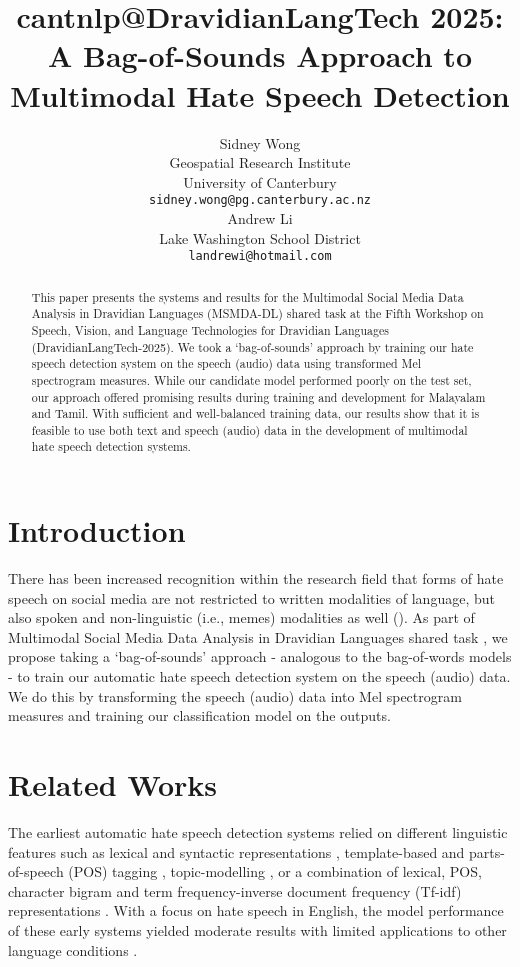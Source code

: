\documentclass[11pt]{article}
\title{cantnlp@DravidianLangTech 2025: A Bag-of-Sounds Approach to Multimodal Hate Speech Detection}
\author{Sidney Wong \\
 Geospatial Research Institute \\
 University of Canterbury \\
 \texttt{sidney.wong@pg.canterbury.ac.nz} \\\And
  Andrew Li \\
  Lake Washington School District \\
  \texttt{landrewi@hotmail.com} \\}
\begin{document}
\maketitle
\begin{abstract}

    This paper presents the systems and results for the Multimodal Social Media Data Analysis in Dravidian Languages (MSMDA-DL) shared task at the Fifth Workshop on Speech, Vision, and Language Technologies for Dravidian Languages (DravidianLangTech-2025). We took a `bag-of-sounds' approach by training our hate speech detection system on the speech (audio) data using transformed Mel spectrogram measures. While our candidate model performed poorly on the test set, our approach offered promising results during training and development for Malayalam and Tamil. With sufficient and well-balanced training data, our results show that it is feasible to use both text and speech (audio) data in the development of multimodal hate speech detection systems.

\end{abstract}

\section{Introduction}
\label{sec:introduction}

    There has been increased recognition within the research field that forms of hate speech on social media are not restricted to written modalities
    of language, but also spoken \cite{chhabra_literature_2023} and non-linguistic (i.e., memes) modalities as well (\citealp{kiela_hateful_2020}). As part of Multimodal Social Media Data Analysis in Dravidian Languages shared task \cite{lal_g_overview_2025}, we propose taking a `bag-of-sounds' approach - analogous to the bag-of-words models - to train our automatic hate speech detection system on the speech (audio) data. We do this by transforming the speech (audio) data into Mel spectrogram measures and training our classification model on the outputs.

\section{Related Works}
\label{sec:related_works}

    The earliest automatic hate speech detection systems relied on different linguistic features such as lexical and syntactic representations \cite{chen_detecting_2012}, template-based and parts-of-speech (POS) tagging \cite{warner_detecting_2012}, topic-modelling \cite{xiang_detecting_2012}, or a combination of lexical, POS, character bigram and term frequency-inverse document frequency (Tf-idf) representations \cite{dinakar_common_2012}. With a focus on hate speech in English, the model performance of these early systems yielded moderate results with limited applications to other language conditions \cite{jahan_systematic_2023}.
    
\end{document}
